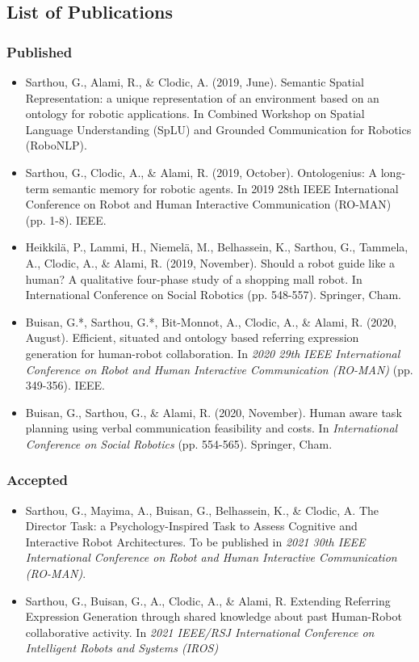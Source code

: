 \subsection*{List of Publications}
\subsubsection*{Published}
\begin{itemize}
\item Sarthou, G., Alami, R., \& Clodic, A. (2019, June). Semantic Spatial Representation: a unique representation of an environment based on an ontology for robotic applications. In Combined Workshop on Spatial Language Understanding (SpLU) and Grounded Communication for Robotics (RoboNLP).

\item Sarthou, G., Clodic, A., \& Alami, R. (2019, October). Ontologenius: A long-term semantic memory for robotic agents. In 2019 28th IEEE International Conference on Robot and Human Interactive Communication (RO-MAN) (pp. 1-8). IEEE.

\item Heikkilä, P., Lammi, H., Niemelä, M., Belhassein, K., Sarthou, G., Tammela, A., Clodic, A.,  \& Alami, R. (2019, November). Should a robot guide like a human? A qualitative four-phase study of a shopping mall robot. In International Conference on Social Robotics (pp. 548-557). Springer, Cham.

\item Buisan, G.*, Sarthou, G.*, Bit-Monnot, A., Clodic, A., \& Alami, R. (2020, August). Efficient, situated and ontology based referring expression generation for human-robot collaboration. In \textit{2020 29th IEEE International Conference on Robot and Human Interactive Communication (RO-MAN)} (pp. 349-356). IEEE.

\item Buisan, G., Sarthou, G., \& Alami, R. (2020, November). Human aware task planning using verbal communication feasibility and costs. In \textit{International Conference on Social Robotics} (pp. 554-565). Springer, Cham.
\end{itemize}

\subsubsection*{Accepted}

\begin{itemize}
\item Sarthou, G., Mayima, A., Buisan, G., Belhassein, K., \& Clodic, A. The Director Task: a Psychology-Inspired Task to Assess Cognitive and Interactive Robot Architectures. To be published in \textit{2021 30th IEEE International Conference on Robot and Human Interactive Communication (RO-MAN)}.

\item Sarthou, G., Buisan, G., A., Clodic, A., \& Alami, R. Extending Referring Expression Generation through shared knowledge about past Human-Robot collaborative activity. In \textit{2021 IEEE/RSJ International Conference on Intelligent Robots and Systems (IROS)}
\end{itemize}

